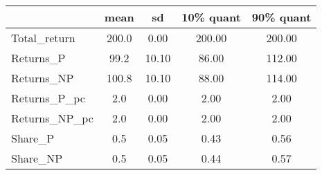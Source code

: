 \begin{tabular}{lcccc}
\toprule
{} &   mean &     sd &  10\% quant &  90\% quant \\
\midrule
Total\_return  &  200.0 &   0.00 &     200.00 &     200.00 \\
Returns\_P     &   99.2 &  10.10 &      86.00 &     112.00 \\
Returns\_NP    &  100.8 &  10.10 &      88.00 &     114.00 \\
Returns\_P\_pc  &    2.0 &   0.00 &       2.00 &       2.00 \\
Returns\_NP\_pc &    2.0 &   0.00 &       2.00 &       2.00 \\
Share\_P       &    0.5 &   0.05 &       0.43 &       0.56 \\
Share\_NP      &    0.5 &   0.05 &       0.44 &       0.57 \\
\bottomrule
\end{tabular}

